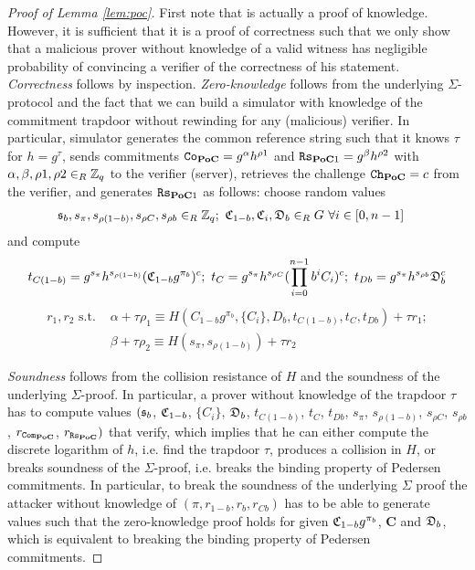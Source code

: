 \begin{proof}[Proof of Lemma \ref{lem:poc}]
First note that \PoC is actually a proof of knowledge.
However, it is sufficient that it is a proof of correctness such that we only show that a malicious prover without knowledge of a valid witness has negligible probability of convincing a verifier of the correctness of his statement.
\emph{Correctness} follows by inspection.
\emph{Zero-knowledge} follows from the underlying $\Sigma$-protocol and the fact that we can build a simulator with knowledge of the commitment trapdoor without rewinding for any (malicious) verifier.
In particular, simulator \SIM generates the common reference string \crs such that it knows $\tau$ for $h=g^\tau$, sends commitments $\mathtt{Co}_\mathsf{\bf PoC}=g^{\alpha}h^{\rho1}$ and $\mathtt{Rs}_{\mathsf{\bf PoC}1}=g^{\beta}h^{\rho2}$ with $\alpha,\beta,\rho1,\rho2\in_R\mathbb{Z}_q$ to the verifier (server), retrieves the challenge $\mathtt{Ch}_\mathsf{\bf PoC}=c$ from the verifier, and generates $\mathtt{Rs}_{\mathsf{\bf PoC}1}$ as follows: choose random values
\begin{align*}  
  & \mathfrak{s}_b, s_\pi, s_{\rho(1-b)}, s_{\rho C}, s_{\rho b}\in_R\mathbb{Z}_q;~ \mathfrak{C}_{1-b}, \mathfrak{C}_i, \mathfrak{D}_b\in_R G~ \forall i\in[0,n-1]
\end{align*}
and compute \vspace*{-1em}
\begin{align*}  
 t_{C(1-b)}=g^{s_\pi}h^{s_{\rho(1-b)}}(\mathfrak{C}_{1-b}g^{\pi_b})^c;~ t_C=g^{s_\pi}h^{s_{\rho C}} (\prod_{i=0}^{n-1}b^i C_i)^c;~ t_{Db}=g^{s_\pi}h^{s_{\rho b}}\mathfrak{D}_b^c 
\end{align*}\vspace*{-2em}
\begin{align*}
  r_1,r_2 \text{ s.t. } & \alpha+\tau\rho_1\equiv H(C_{1-b}g^{\pi_b}, \{C_i\}, D_b, t_{C(1-b)}, t_C, t_{Db}) + \tau r_1; \\
  & \beta + \tau\rho_2 \equiv H(s_{\pi}, s_{\rho (1-b)}) + \tau r_2
\end{align*}

\noindent
\emph{Soundness} follows from the collision resistance of $H$ and the soundness of the underlying $\Sigma$-proof.
In particular, a prover without knowledge of the trapdoor $\tau$ has to compute values $(\mathfrak{s}_b$, $\mathfrak{C}_{1-b}$, $\{C_i\}$, $\mathfrak{D}_b$, $t_{C(1-b)}$, $t_C$, $t_{Db}$, $s_{\pi}$, $s_{\rho (1-b)}$, $s_{\rho C}$, $s_{\rho b}$, $r_{\mathtt{Com}_{\mathsf{\bf PoC}}}$, $r_{\mathtt{Rs}_{\mathsf{\bf PoC}}})$ that verify, which implies that he can either compute the discrete logarithm of $h$, i.e. find the trapdoor $\tau$, produces a collision in $H$, or breaks soundness of the $\Sigma$-proof, i.e. breaks the binding property of Pedersen commitments.
In particular, to break the soundness of the underlying $\Sigma$ proof the attacker without knowledge of $(\pi,r_{1-b},r_b,r_{Cb})$ has to be able to generate values such that the \PoC zero-knowledge proof holds for given $\mathfrak{C}_{1-b}g^{\pi_b}$, $\bm C$ and $\mathfrak{D}_b$, which is equivalent to breaking the binding property of Pedersen commitments.
\end{proof}


